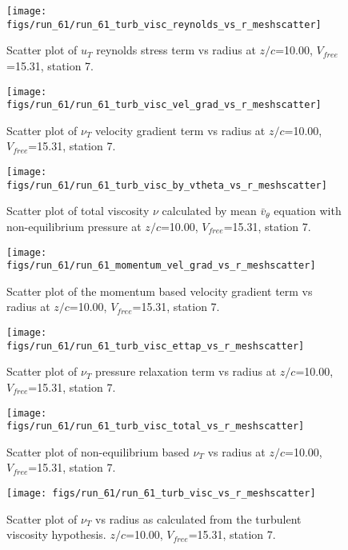 \begin{figure}[H]
\centering
\texttt{[image: figs/run\_61/run\_61\_turb\_visc\_reynolds\_vs\_r\_meshscatter]}
\caption{Scatter plot of $
u_T$ reynolds stress term vs radius at $z/c$=10.00, $V_{free}$=15.31, station 7.}
\end{figure}


\begin{figure}[H]
\centering
\texttt{[image: figs/run\_61/run\_61\_turb\_visc\_vel\_grad\_vs\_r\_meshscatter]}
\caption{Scatter plot of $\nu_T$ velocity gradient term vs radius at $z/c$=10.00, $V_{free}$=15.31, station 7.}
\end{figure}


\begin{figure}[H]
\centering
\texttt{[image: figs/run\_61/run\_61\_turb\_visc\_by\_vtheta\_vs\_r\_meshscatter]}
\caption{Scatter plot of total viscosity $\nu$ calculated by mean $\bar{v}_{\theta}$ equation with non-equilibrium pressure at $z/c$=10.00, $V_{free}$=15.31, station 7.}
\end{figure}


\begin{figure}[H]
\centering
\texttt{[image: figs/run\_61/run\_61\_momentum\_vel\_grad\_vs\_r\_meshscatter]}
\caption{Scatter plot of the momentum based velocity gradient term vs radius at $z/c$=10.00, $V_{free}$=15.31, station 7.}
\end{figure}


\begin{figure}[H]
\centering
\texttt{[image: figs/run\_61/run\_61\_turb\_visc\_ettap\_vs\_r\_meshscatter]}
\caption{Scatter plot of $\nu_T$ pressure relaxation term vs radius at $z/c$=10.00, $V_{free}$=15.31, station 7.}
\end{figure}


\begin{figure}[H]
\centering
\texttt{[image: figs/run\_61/run\_61\_turb\_visc\_total\_vs\_r\_meshscatter]}
\caption{Scatter plot of non-equilibrium based $\nu_T$ vs radius at $z/c$=10.00, $V_{free}$=15.31, station 7.}
\end{figure}


\begin{figure}[H]
\centering
\texttt{[image: figs/run\_61/run\_61\_turb\_visc\_vs\_r\_meshscatter]}
\caption{Scatter plot of $\nu_T$ vs radius as calculated from the turbulent viscosity hypothesis. $z/c$=10.00, $V_{free}$=15.31, station 7.}
\end{figure}


